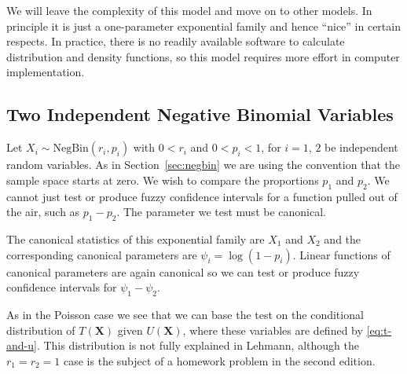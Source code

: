 \documentclass{article}
\newcommand{\NegativeBinomialDis}{\text{NegBin}}
\begin{document}
We will leave the complexity of this model and move on to other models.
In principle it is just a one-parameter exponential family and hence ``nice''
in certain respects.  In practice, there is no readily available software
to calculate distribution and density functions, so this model requires
more effort in computer implementation.

\subsection{Two Independent Negative Binomial Variables}

Let $X_i \sim \NegativeBinomialDis(r_i, p_i)$ with $0 < r_i$ and
$0 < p_i < 1$, for $i = 1$, $2$ be independent random variables.
As in Section~\ref{sec:negbin} we are using the convention that the
sample space starts at zero.  We wish to compare the proportions $p_1$ and
$p_2$.  We cannot just test or produce fuzzy confidence intervals for
a function pulled out of the air, such as $p_1 - p_2$.  The parameter
we test must be canonical.

The canonical statistics of this exponential family are $X_1$ and $X_2$
and the corresponding canonical parameters are $\psi_i = \log(1 - p_i)$.
Linear functions of canonical parameters are again canonical so we can test
or produce fuzzy confidence intervals for $\psi_1 - \psi_2$.

As in the Poisson case we see that we can base the test on the conditional
distribution of $T(\mathbf{X})$ given $U(\mathbf{X})$, where these variables
are defined by \eqref{eq:t-and-u}.
This distribution is not fully explained in Lehmann, although
the $r_1 = r_2 = 1$ case is the subject of a homework problem in the
second edition.
\end{document}
